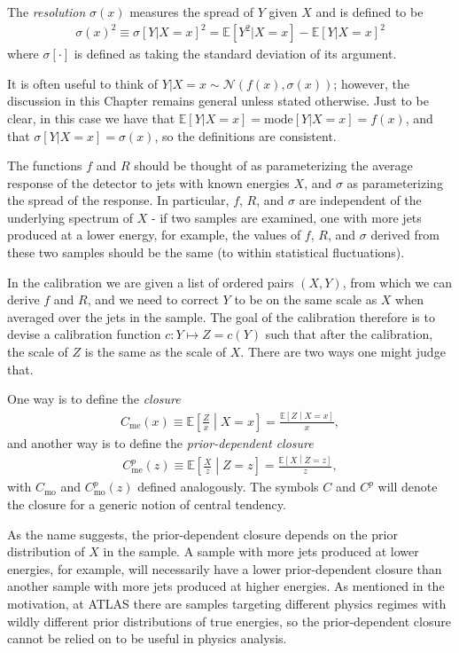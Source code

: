 The \textit{resolution} $\sigma(x)$ measures the spread of $Y$ given $X$ and is defined to be
\begin{align}
  \sigma(x)^2 \equiv \sigma[Y|X=x]^2 = \mathbb{E}[Y^2|X=x]-\mathbb{E}[Y|X=x]^2
\end{align}
where $\sigma[\cdot]$ is defined as taking the standard deviation of its argument.

It is often useful to think of $Y|X=x\sim \mathcal{N}(f(x),\sigma(x))$; however, the discussion in this Chapter remains general unless stated otherwise.
Just to be clear, in this case we have that $\mathbb{E}[Y|X=x]=\text{mode}[Y|X=x]=f(x)$, and that $\sigma[Y|X=x] = \sigma(x)$, so the definitions are consistent.

The functions $f$ and $R$ should be thought of as parameterizing the average response of the detector to jets with known energies $X$, and $\sigma$ as parameterizing the spread of the response.
In particular, $f$, $R$, and $\sigma$ are independent of the underlying spectrum of $X$ - if two samples are examined, one with more jets produced at a lower energy, for example, the values of $f$, $R$, and $\sigma$ derived from these two samples should be the same (to within statistical fluctuations).

In the calibration we are given a list of ordered pairs $(X,Y)$, from which we can derive $f$ and $R$, and we need to correct $Y$ to be on the same scale as $X$ when averaged over the jets in the sample.
The goal of the calibration therefore is to devise a calibration function $c: Y\mapsto Z=c(Y)$ such that after the calibration, the scale of $Z$ is the same as the scale of $X$.
There are two ways one might judge that.

One way is to define the \textit{closure}
\begin{align}
  C_\text{me}(x) \equiv \mathbb{E}\left[\frac{Z}{x}\middle| X=x\right] = \frac{\mathbb{E}\left[Z\middle| X=x\right]}{x}
\label{eqn:NI:closure},
\end{align}
and another way is to define the \textit{prior-dependent closure}
\begin{align}
  C^p_\text{me}(z) \equiv \mathbb{E}\left[\frac{X}{z}\middle| Z=z\right] = \frac{\mathbb{E}\left[X\middle| Z=z\right]}{z}
\label{eqn:NI:closure_priordependent},
\end{align}
with $C_\text{mo}$ and $C^p_\text{mo}(z)$ defined analogously.
The symbols $C$ and $C^p$ will denote the closure for a generic notion of central tendency.

As the name suggests, the prior-dependent closure depends on the prior distribution of $X$ in the sample.
A sample with more jets produced at lower energies, for example, will necessarily have a lower prior-dependent closure than another sample with more jets produced at higher energies.
As mentioned in the motivation, at ATLAS there are samples targeting different physics regimes with wildly different prior distributions of true energies, so the prior-dependent closure cannot be relied on to be useful in physics analysis.

